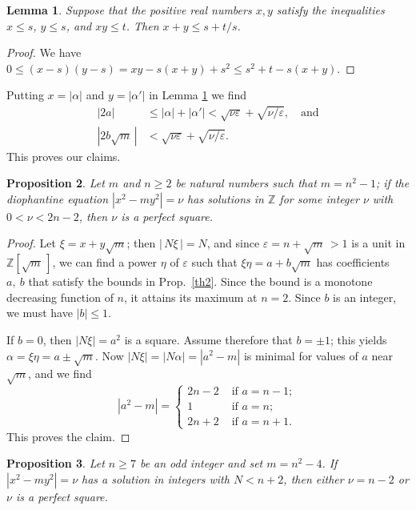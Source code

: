 \documentclass{amsart}
\newtheorem{lemma}{Lemma}
\newtheorem{prop}[lemma]{Proposition}
\newcommand{\Z}{{\mathbb Z}}
\newcommand{\eps}{\varepsilon}
\begin{document}
\begin{lemma}\label{th1}
Suppose that the positive real numbers $x, y$ satisfy the
inequalities $x \leq s$, $y \leq s$, and $xy \leq t$. Then
$x+y \leq s+t/s$.
\end{lemma}

\begin{proof}
  We have $0 \leq (x-s)(y-s) = xy-s(x+y)+s^{2} \leq s^{2}+t-s(x+y)$.
\end{proof}

Putting $x=|\alpha|$ and $y=|\alpha'|$ in Lemma \ref{th1}
we find
\begin{align*}
  |2a| & \leq |\alpha|+|\alpha'|< \sqrt{\nu\eps}+ \sqrt{\nu/\eps},
  \quad \text{and} \\
  |2b \sqrt{m}\,| & < \sqrt{\nu\eps}+\sqrt{\nu/\eps}.
\end{align*}
This proves our claims.

\begin{prop}\label{th4}
  Let $m$ and $n \ge 2$  be natural numbers such that $m = n^2-1$; if
  the diophantine equation $|x^{2}-my^{2}| = \nu$ has solutions in
  $\Z$ for some integer $\nu$ with $0 < \nu < 2n-2$, then $\nu$ is a
  perfect square.
\end{prop}

\begin{proof}
Let $\xi = x+y\sqrt{m}$; then $|\,N \xi\,|=N$, and since
$\eps = n + \sqrt{m}\,>1$ is a unit in $\Z[\sqrt{m}\,]$,
we can find a power $\eta$ of $\varepsilon$ such that
$\xi \eta=a+b\sqrt{m}$ has coefficients $a, \ b$ that satisfy
the bounds in Prop.~\ref{th2}. Since the bound is a monotone decreasing
function of $n$, it attains its maximum at $n = 2$. Since $b$ is an integer,
we must have $|b| \le 1$.

If $b=0$, then $|N\xi|=a^{2}$ is a square. Assume therefore that
$b=\pm 1$; this yields $\alpha = \xi \eta = a \pm \sqrt{m}.$
Now $|N\xi| = |N\alpha| = |a^{2}-m|$ is minimal for
values of $a$ near $\sqrt{m}$, and we find
$$ |a^{2}-m| = \begin{cases}
  2n-2 & \text{ if } a=n-1; \\
   1   & \text{ if } a=n;  \\
  2n+2 & \text{ if } a=n+1. \end{cases} $$
This proves the claim.
\end{proof}

\begin{prop}\label{th4b}
  Let $n \ge 7$ be an odd integer and set $m = n^2 - 4$.
  If $|x^2 - my^2| = \nu$ has a solution in integers with $N < n+2$,
  then either $\nu = n-2$ or $\nu$ is a perfect square.
\end{prop}
\end{document}
